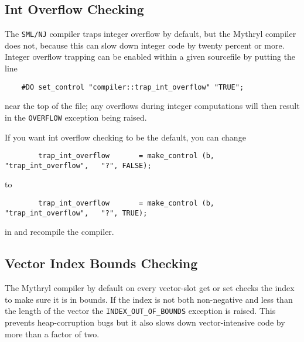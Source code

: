 \cutend*


\subsection{Int Overflow Checking}
\label{section:tut:full-monte:int-overflow-checking}

The {\tt SML/NJ} compiler traps integer overflow by default, but 
the Mythryl compiler does not, because this can slow down integer 
code by twenty percent or more.  Integer overflow trapping can be enabled 
within a given sourcefile by putting the line 

\begin{verbatim}
    #DO set_control "compiler::trap_int_overflow" "TRUE";
\end{verbatim}

near the top of the file; any overflows during integer computations 
will then result in the {\tt OVERFLOW} exception being raised. 

If you want int overflow checking to be the default, you can change 

\begin{verbatim}
        trap_int_overflow       = make_control (b, "trap_int_overflow",   "?", FALSE);
\end{verbatim}

to 

\begin{verbatim}
        trap_int_overflow       = make_control (b, "trap_int_overflow",   "?", TRUE);
\end{verbatim}

in   
and recompile the compiler.

\cutend*


\subsection{Vector Index Bounds Checking}
\label{section:tut:full-monte:vector-index-bounds-checking}

The Mythryl compiler by default on every vector-slot get or set checks the index 
to make sure it is in bounds.  If the index is not both non-negative and less 
than the length of the vector the {\tt INDEX_OUT_OF_BOUNDS} exception is raised.  This 
prevents heap-corruption bugs but it also slows down vector-intensive code by 
more than a factor of two. 

